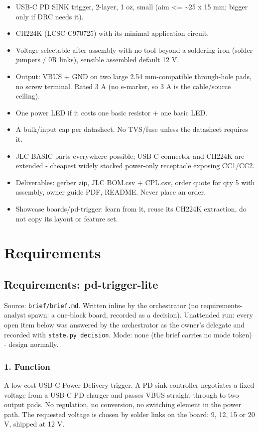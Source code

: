 \documentclass[11pt,a4paper]{article}
\begin{document}
\begin{itemize}
\item USB-C PD SINK trigger, 2-layer, 1 oz, small (aim \textless{}= \textasciitilde{}25 x 15 mm; bigger only if DRC needs it).
\item CH224K (LCSC C970725) with its minimal application circuit.
\item Voltage selectable after assembly with no tool beyond a soldering iron (solder jumpers /
0R links), sensible assembled default 12 V.
\item Output: VBUS + GND on two large 2.54 mm-compatible through-hole pads, no screw terminal.
Rated 3 A (no e-marker, so 3 A is the cable/source ceiling).
\item One power LED if it costs one basic resistor + one basic LED.
\item A bulk/input cap per datasheet. No TVS/fuse unless the datasheet requires it.
\item JLC BASIC parts everywhere possible; USB-C connector and CH224K are extended - cheapest
widely stocked power-only receptacle exposing CC1/CC2.
\item Deliverables: gerber zip, JLC BOM.csv + CPL.csv, order quote for qty 5 with assembly,
owner guide PDF, README. Never place an order.
\item Showcase boards/pd-trigger: learn from it, reuse its CH224K extraction, do not copy its
layout or feature set.
\end{itemize}
\section{Requirements}
\subsection*{Requirements: pd-trigger-lite}
Source: \texttt{brief/brief.md}. Written inline by the orchestrator (no requirements-analyst spawn: a one-block board, recorded as a decision). Unattended run: every open item below was answered by the orchestrator as the owner's delegate and recorded with \texttt{state.py decision}. Mode: none (the brief carries no mode token) - design normally.

\subsubsection*{1. Function}
A low-cost USB-C Power Delivery trigger. A PD sink controller negotiates a fixed voltage from a USB-C PD charger and passes VBUS straight through to two output pads. No regulation, no conversion, no switching element in the power path. The requested voltage is chosen by solder links on the board: 9, 12, 15 or 20 V, shipped at 12 V.
\end{document}

